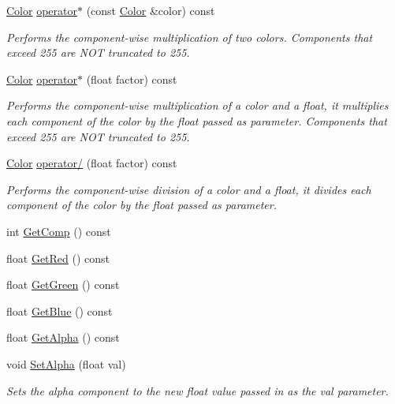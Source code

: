 \begin{DoxyCompactItemize}
\hyperlink{classColor}{Color} \hyperlink{classColor_a6cc052b0ca852fb8703e642e49fcdbe9}{operator$\ast$} (const \hyperlink{classColor}{Color} \&color) const
\begin{DoxyCompactList}\small\item\em Performs the component-\/wise multiplication of two colors. Components that exceed 255 are N\+OT truncated to 255. \end{DoxyCompactList}\item 
\hyperlink{classColor}{Color} \hyperlink{classColor_a1913ac35b2deeabf7f9bc449deae499e}{operator$\ast$} (float factor) const
\begin{DoxyCompactList}\small\item\em Performs the component-\/wise multiplication of a color and a float, it multiplies each component of the color by the float passed as parameter. Components that exceed 255 are N\+OT truncated to 255. \end{DoxyCompactList}\item 
\hyperlink{classColor}{Color} \hyperlink{classColor_ac1591338c7f8714e3683cca15ffb2fd3}{operator/} (float factor) const
\begin{DoxyCompactList}\small\item\em Performs the component-\/wise division of a color and a float, it divides each component of the color by the float passed as parameter. \end{DoxyCompactList}\item 
int \hyperlink{classColor_ae63e798d250d1b1393008e019a054253}{Get\+Comp} () const
\item 
float \hyperlink{classColor_aaf750ff9360c9eb6abf1de07ec710c1e}{Get\+Red} () const
\item 
float \hyperlink{classColor_a0c1d09e2435aefad98931d765bc36d01}{Get\+Green} () const
\item 
float \hyperlink{classColor_a79e225ea938465a072b697b9431f8150}{Get\+Blue} () const
\item 
float \hyperlink{classColor_a1eb5d3ba0276e2b555211aae3cd500b6}{Get\+Alpha} () const
\item 
\mbox{\label{classColor_afcdaa6ae749a1325edc313429a3a87d3}} 
void \hyperlink{classColor_afcdaa6ae749a1325edc313429a3a87d3}{Set\+Alpha} (float val)
\begin{DoxyCompactList}\small\item\em Sets the alpha component to the new float value passed in as the val parameter. \end{DoxyCompactList}\item 

\end{DoxyCompactItemize}
